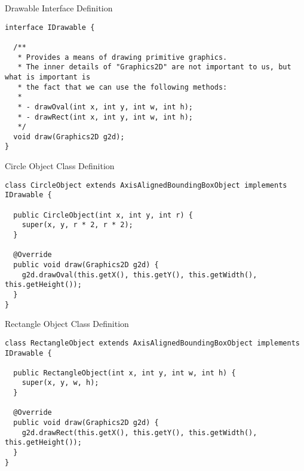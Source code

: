 \begin{cl}{Drawable Interface Definition}
\begin{lstlisting}[language=MyJava]
interface IDrawable {
  
  /**
   * Provides a means of drawing primitive graphics.
   * The inner details of "Graphics2D" are not important to us, but what is important is
   * the fact that we can use the following methods:
   * 
   * - drawOval(int x, int y, int w, int h);
   * - drawRect(int x, int y, int w, int h);
   */
  void draw(Graphics2D g2d); 
}
\end{lstlisting}
\end{cl} 

\begin{cl}{Circle Object Class Definition}
\begin{lstlisting}[language=MyJava]
class CircleObject extends AxisAlignedBoundingBoxObject implements IDrawable {
  
  public CircleObject(int x, int y, int r) {
    super(x, y, r * 2, r * 2);
  }

  @Override
  public void draw(Graphics2D g2d) {
    g2d.drawOval(this.getX(), this.getY(), this.getWidth(), this.getHeight());
  }
}
\end{lstlisting}
\end{cl}

\begin{cl}{Rectangle Object Class Definition}
\begin{lstlisting}[language=MyJava]
class RectangleObject extends AxisAlignedBoundingBoxObject implements IDrawable {
  
  public RectangleObject(int x, int y, int w, int h) {
    super(x, y, w, h);
  }
  
  @Override
  public void draw(Graphics2D g2d) {
    g2d.drawRect(this.getX(), this.getY(), this.getWidth(), this.getHeight());
  }
}
\end{lstlisting}
\end{cl}

